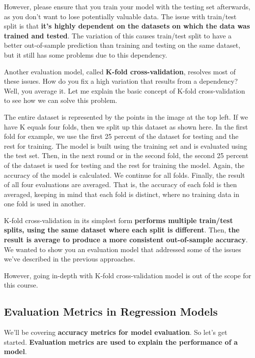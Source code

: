     However, please ensure that you train your model with the testing set afterwards, as you don't want to lose potentially valuable data. 
    The issue with train/test split is that \textbf{it's highly dependent on the datasets on which the data was trained and tested}.
    The variation of this causes train/test split to have a better out-of-sample prediction than training and testing on the same dataset, but it still has some problems due to this dependency. 
    
    Another evaluation model, called \textbf{K-fold cross-validation}, resolves most of these issues.
    How do you fix a high variation that results from a dependency? Well, you average it. Let me explain the basic concept of K-fold cross-validation to see how we can solve this problem. 
    
    The entire dataset is represented by the points in the image at the top left. If we have K equals four folds, then we split up this dataset as shown here. In the first fold for example, we use the first 25 percent of the dataset for testing and the rest for training. The model is built using the training set and is evaluated using the test set. Then, in the next round or in the second fold, the second 25 percent of the dataset is used for testing and the rest for training the model. Again, the accuracy of the model is calculated. We continue for all folds. Finally, the result of all four evaluations are averaged. That is, the accuracy of each fold is then averaged, keeping in mind that each fold is distinct, where no training data in one fold is used in another. 
    
    K-fold cross-validation in its simplest form \textbf{performs multiple train/test splits, using the same dataset where each split is different}. Then, \textbf{the result is average to produce a more consistent out-of-sample accuracy}. We wanted to show you an evaluation model that addressed some of the issues we've described in the previous approaches.
    
     However, going in-depth with K-fold cross-validation model is out of the scope for this course.
	
	\subsection{Evaluation Metrics in Regression Models}
	
	We'll be covering \textbf{accuracy metrics for model evaluation}. So let's get started. \textbf{Evaluation metrics are used to explain the performance of a model}. 
	
